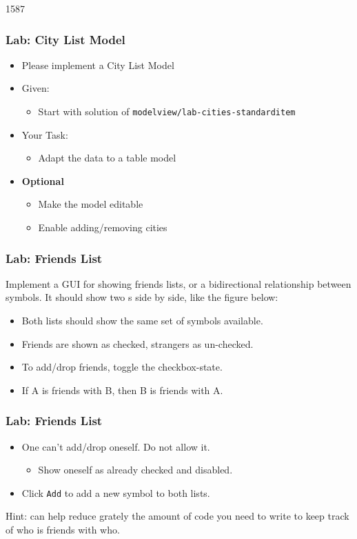 \begin{slide}{1587}\frametitle{Lab: City List Model}
  \begin{itemize}
  \item Please implement a City List Model
  \item Given:
    \begin{itemize}
    \item Start with solution of \texttt{modelview/lab-cities-standarditem}
    \end{itemize}
  \item Your Task:
    \begin{itemize}
    \item Adapt the data to a table model
    \end{itemize}
  \item \textbf{Optional}
    \begin{itemize}
    \item Make the model editable
    \item Enable adding/removing cities
   \end{itemize}
 \end{itemize}
\end{slide}

\begin{slide}[fragile]
\frametitle{Lab: Friends List}
Implement a GUI for showing friends lists, or a bidirectional relationship between symbols.
It should show two s side by side, like the figure below:


\begin{itemize}
\item  Both lists should show the same set of symbols available.
\item  Friends are shown as checked, strangers as un-checked.
\item  To add/drop friends, toggle the checkbox-state.
\item  If A is friends with B, then B is friends with A.
\end{itemize}
\end{slide}

\begin{slide}
\frametitle{Lab: Friends List}
\begin{itemize}
\item  One can't add/drop oneself. Do not allow it. 
\begin{itemize}
\item Show oneself as already checked and disabled.
\end{itemize}
\item  Click \texttt{Add} to add a new symbol to both lists.
\end{itemize}
Hint:  can help reduce grately the amount of code you need to write to keep track of who is friends with who.
\end{slide}


